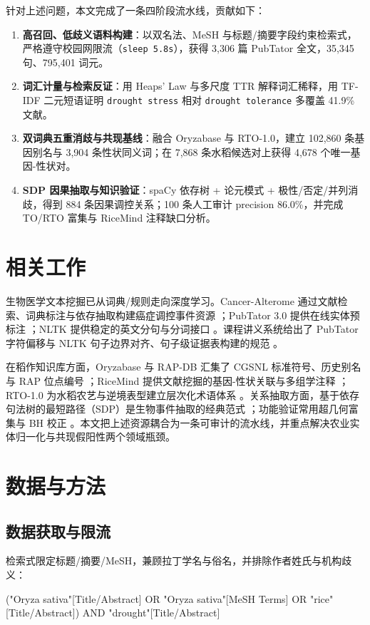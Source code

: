 \documentclass[conference]{IEEEtran}
\begin{document}
针对上述问题，本文完成了一条四阶段流水线，贡献如下：
\begin{enumerate}\setlength{\itemsep}{0pt}\setlength{\parsep}{0pt}\setlength{\topsep}{1pt}
  \item \textbf{高召回、低歧义语料构建}：以双名法、MeSH 与标题/摘要字段约束检索式，严格遵守校园网限流（\texttt{sleep 5.8s}），获得 3,306 篇 PubTator 全文，35,345 句、795,401 词元。
  \item \textbf{词汇计量与检索反证}：用 Heaps' Law 与多尺度 TTR 解释词汇稀释，用 TF-IDF 二元短语证明 \texttt{drought stress} 相对 \texttt{drought tolerance} 多覆盖 41.9\% 文献。
  \item \textbf{双词典五重消歧与共现基线}：融合 Oryzabase 与 RTO-1.0，建立 102,860 条基因别名与 3,904 条性状同义词；在 7,868 条水稻候选对上获得 4,678 个唯一基因-性状对。
  \item \textbf{SDP 因果抽取与知识验证}：spaCy 依存树 + 论元模式 + 极性/否定/并列消歧，得到 884 条因果调控关系；100 条人工审计 precision 86.0\%，并完成 TO/RTO 富集与 RiceMind 注释缺口分析。
\end{enumerate}

\section{相关工作}
生物医学文本挖掘已从词典/规则走向深度学习。Cancer-Alterome 通过文献检索、词典标注与依存抽取构建癌症调控事件资源 \cite{canceralterome2024}；PubTator 3.0 提供在线实体预标注 \cite{wei2024pubtator3}；NLTK 提供稳定的英文分句与分词接口 \cite{nltk2009}。课程讲义系统给出了 PubTator 字符偏移与 NLTK 句子边界对齐、句子级证据表构建的规范 \cite{slides2026}。

在稻作知识库方面，Oryzabase 与 RAP-DB 汇集了 CGSNL 标准符号、历史别名与 RAP 位点编号 \cite{kurata2006oryzabase,sakai2013rapdb}；RiceMind 提供文献挖掘的基因-性状关联与多组学注释 \cite{ricemind2024}；RTO-1.0 为水稻农艺与逆境表型建立层次化术语体系 \cite{rto2026}。关系抽取方面，基于依存句法树的最短路径（SDP）是生物事件抽取的经典范式 \cite{fundel2007}；功能验证常用超几何富集与 BH 校正 \cite{ashburner2000,huang2009}。本文把上述资源耦合为一条可审计的流水线，并重点解决农业实体归一化与共现假阳性两个领域瓶颈。

\section{数据与方法}

\subsection{数据获取与限流}
检索式限定标题/摘要/MeSH，兼顾拉丁学名与俗名，并排除作者姓氏与机构歧义：
{\centering\vspace{-2pt}\small\ttfamily ("Oryza sativa"[Title/Abstract] OR "Oryza sativa"[MeSH Terms] OR "rice"[Title/Abstract]) AND "drought"[Title/Abstract]\par\vspace{-2pt}}
\end{document}
